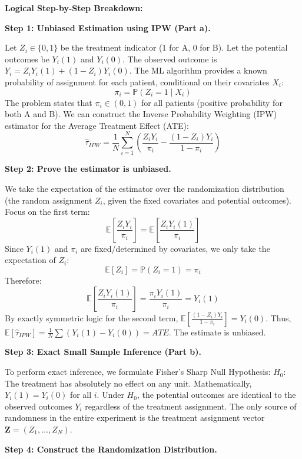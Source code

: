 \begin{solution}
\textbf{Logical Step-by-Step Breakdown:}

\textbf{Step 1: Unbiased Estimation using IPW (Part a).}

Let $Z_i \in \{0, 1\}$ be the treatment indicator (1 for A, 0 for B). Let the potential outcomes be $Y_i(1)$ and $Y_i(0)$. The observed outcome is $Y_i = Z_i Y_i(1) + (1-Z_i)Y_i(0)$.
The ML algorithm provides a known probability of assignment for each patient, conditional on their covariates $X_i$:
\[ \pi_i = \mathbb{P}(Z_i = 1 \mid X_i) \]
The problem states that $\pi_i \in (0, 1)$ for all patients (positive probability for both A and B).
We can construct the Inverse Probability Weighting (IPW) estimator for the Average Treatment Effect (ATE):
\[ \hat{\tau}_{IPW} = \frac{1}{N} \sum_{i=1}^N \left( \frac{Z_i Y_i}{\pi_i} - \frac{(1 - Z_i) Y_i}{1 - \pi_i} \right) \]

\textbf{Step 2: Prove the estimator is unbiased.}

We take the expectation of the estimator over the randomization distribution (the random assignment $Z_i$, given the fixed covariates and potential outcomes).
Focus on the first term:
\[ \mathbb{E}\left[ \frac{Z_i Y_i}{\pi_i} \right] = \mathbb{E}\left[ \frac{Z_i Y_i(1)}{\pi_i} \right] \]
Since $Y_i(1)$ and $\pi_i$ are fixed/determined by covariates, we only take the expectation of $Z_i$:
\[ \mathbb{E}[Z_i] = \mathbb{P}(Z_i = 1) = \pi_i \]
Therefore:
\[ \mathbb{E}\left[ \frac{Z_i Y_i(1)}{\pi_i} \right] = \frac{\pi_i Y_i(1)}{\pi_i} = Y_i(1) \]
By exactly symmetric logic for the second term, $\mathbb{E}\left[ \frac{(1 - Z_i) Y_i}{1 - \pi_i} \right] = Y_i(0)$.
Thus, $\mathbb{E}[\hat{\tau}_{IPW}] = \frac{1}{N} \sum (Y_i(1) - Y_i(0)) = ATE$. The estimate is unbiased.

\textbf{Step 3: Exact Small Sample Inference (Part b).}

To perform exact inference, we formulate Fisher's Sharp Null Hypothesis:
$H_0$: The treatment has absolutely no effect on any unit. Mathematically, $Y_i(1) = Y_i(0)$ for all $i$.
Under $H_0$, the potential outcomes are identical to the observed outcomes $Y_i$ regardless of the treatment assignment. The only source of randomness in the entire experiment is the treatment assignment vector $\mathbf{Z} = (Z_1, \dots, Z_N)$.

\textbf{Step 4: Construct the Randomization Distribution.}


\end{solution}
